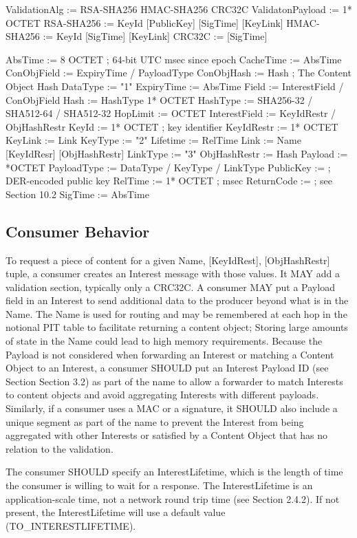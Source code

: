 \documentclass[12pt]{article}
\begin{document}
ValidationAlg := RSA-SHA256 HMAC-SHA256 CRC32C
ValidatonPayload := 1* OCTET
RSA-SHA256    := KeyId [PublicKey] [SigTime] [KeyLink]
HMAC-SHA256   := KeyId [SigTime] [KeyLink]
CRC32C        := [SigTime]

AbsTime       := 8 OCTET ; 64-bit UTC msec since epoch
CacheTime     := AbsTime
ConObjField   := ExpiryTime / PayloadType
ConObjHash    := Hash ; The Content Object Hash
DataType      := "1"
ExpiryTime    := AbsTime
Field         := InterestField / ConObjField
Hash          := HashType 1* OCTET
HashType      := SHA256-32 / SHA512-64 / SHA512-32
HopLimit      := OCTET
InterestField := KeyIdRestr / ObjHashRestr
KeyId         := 1* OCTET ; key identifier
KeyIdRestr    := 1* OCTET
KeyLink       := Link
KeyType       := "2"
Lifetime      := RelTime
Link          := Name [KeyIdResr] [ObjHashRestr]
LinkType      := "3"
ObjHashRestr  := Hash
Payload       := *OCTET
PayloadType   := DataType / KeyType / LinkType
PublicKey     := ; DER-encoded public key
RelTime       := 1* OCTET ; msec
ReturnCode    := ; see Section 10.2
SigTime       := AbsTime

\subsection{Consumer Behavior}
To request a piece of content for a given {Name, [KeyIdRest],
[ObjHashRestr]} tuple, a consumer creates an Interest message with
those values.  It MAY add a validation section, typically only a
CRC32C.  A consumer MAY put a Payload field in an Interest to send
additional data to the producer beyond what is in the Name.  The Name
is used for routing and may be remembered at each hop in the notional
PIT table to facilitate returning a content object; Storing large
amounts of state in the Name could lead to high memory requirements.
Because the Payload is not considered when forwarding an Interest or
matching a Content Object to an Interest, a consumer SHOULD put an
Interest Payload ID (see Section Section 3.2) as part of the name to
allow a forwarder to match Interests to content objects and avoid
aggregating Interests with different payloads.  Similarly, if a
consumer uses a MAC or a signature, it SHOULD also include a unique
segment as part of the name to prevent the Interest from being
aggregated with other Interests or satisfied by a Content Object that
has no relation to the validation.

The consumer SHOULD specify an InterestLifetime, which is the length
of time the consumer is willing to wait for a response.  The
InterestLifetime is an application-scale time, not a network round
trip time (see Section 2.4.2).  If not present, the InterestLifetime
will use a default value (TO\_INTERESTLIFETIME).
\end{document}
